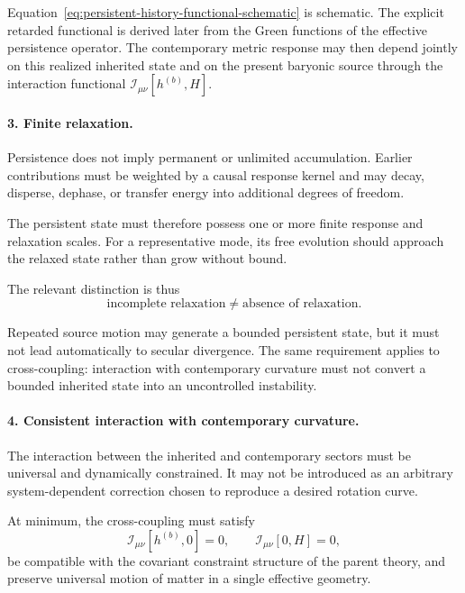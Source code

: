 Equation~\eqref{eq:persistent-history-functional-schematic} is schematic. The
explicit retarded functional is derived later from the Green functions of the
effective persistence operator. The contemporary metric response may then
depend jointly on this realized inherited state and on the present baryonic
source through the interaction functional
$\mathcal{I}_{\mu\nu}[h^{(b)},H]$.

\paragraph{3. Finite relaxation.}

Persistence does not imply permanent or unlimited accumulation. Earlier
contributions must be weighted by a causal response kernel and may decay,
disperse, dephase, or transfer energy into additional degrees of freedom.

The persistent state must therefore possess one or more finite response and
relaxation scales. For a representative mode, its free evolution should
approach the relaxed state rather than grow without bound.

The relevant distinction is thus
\begin{equation}
    \text{incomplete relaxation}
    \neq
    \text{absence of relaxation}.
    \label{eq:incomplete-not-absent-relaxation}
\end{equation}

Repeated source motion may generate a bounded persistent state, but it must not
lead automatically to secular divergence. The same requirement applies to
cross-coupling: interaction with contemporary curvature must not convert a
bounded inherited state into an uncontrolled instability.

\paragraph{4. Consistent interaction with contemporary curvature.}

The interaction between the inherited and contemporary sectors must be
universal and dynamically constrained. It may not be introduced as an arbitrary
system-dependent correction chosen to reproduce a desired rotation curve.

At minimum, the cross-coupling must satisfy
\begin{equation}
    \mathcal{I}_{\mu\nu}[h^{(b)},0]=0,
    \qquad
    \mathcal{I}_{\mu\nu}[0,H]=0,
\end{equation}
be compatible with the covariant constraint structure of the parent theory, and
preserve universal motion of matter in a single effective geometry.

